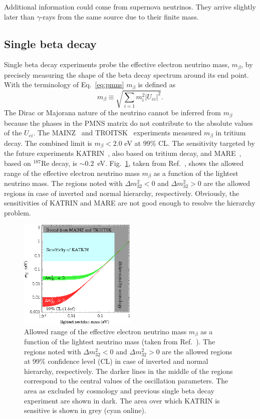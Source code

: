Additional information could come from supernova neutrinos.
They arrive slightly later than $\gamma$-rays from the same
source due to their finite mass.

\subsection{Single beta decay}
\label{sec:sbd}
Single beta decay experiments probe the effective electron neutrino mass, $m_{\beta}$, by precisely measuring the shape of the beta decay spectrum around its end point. With the terminology of Eq.~\ref{eq:pmns} $m_{\beta}$ is defined as
\begin{equation}
  \label{eq:m1b}
  m_{\beta} \equiv \sqrt{\sum_{i=1}m_{i}^{2}|U_{ei}|^{2}}.
\end{equation}
The Dirac or Majorana nature of the neutrino cannot be inferred from $m_{\beta}$ because the phases in the PMNS matrix do not contribute to the absolute values of the $U_{ei}$. The MAINZ~\cite{Mai99} and TROITSK~\cite{Tro99} experiments measured $m_{\beta}$ in tritium decay. The combined limit is $m_{\beta} < 2.0$ eV at 99\% CL. The sensitivity targeted by the future experiments KATRIN~\cite{Kat01}, also based on tritium decay, and MARE~\cite{Mar05}, based on $^{187}$Re decay, is $\sim 0.2$~eV. Fig.~\ref{fig:m1bVSlightest}, taken from Ref.~\cite{Str05}, shows the allowed range of the effective electron neutrino mass $m_{\beta}$ as a function of the lightest neutrino mass. The regions noted with $\Delta m^{2}_{32}<0$ and $\Delta m^{2}_{32}>0$ are the allowed regions in case of inverted and normal hierarchy, respectively. Obviously, the sensitivities of KATRIN and MARE are not good enough to resolve the hierarchy problem.
\begin{figure}[tbhp]
  \centering
  \includegraphics[width=0.5\textwidth]{m1bVSlightest}  
  \caption{Allowed range of the effective electron neutrino mass     $m_{\beta}$ as a function of the lightest neutrino mass (taken from     Ref.~\cite{Str05}). The regions noted with $\Delta m^{2}_{32}<0$     and $\Delta m^{2}_{32}>0$ are the allowed regions at 99\%     confidence level (CL) in case of inverted and normal hierarchy,     respectively. The darker lines in the middle of the regions     correspond to the central values of the oscillation parameters. The area as excluded by cosmology and previous single beta decay experiment are shown in dark. The area over which KATRIN is sensitive is shown in grey (cyan online).}
  \label{fig:m1bVSlightest}
\end{figure}

